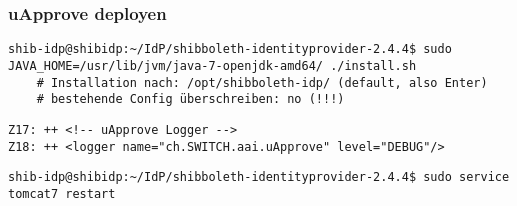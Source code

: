 \subsubsection*{uApprove deployen}
 \begin{lstlisting}
shib-idp@shibidp:~/IdP/shibboleth-identityprovider-2.4.4$ sudo JAVA_HOME=/usr/lib/jvm/java-7-openjdk-amd64/ ./install.sh
	# Installation nach: /opt/shibboleth-idp/ (default, also Enter)
	# bestehende Config überschreiben: no (!!!)
\end{lstlisting}
\begin{lstlisting}
Z17: ++ <!-- uApprove Logger -->
Z18: ++ <logger name="ch.SWITCH.aai.uApprove" level="DEBUG"/>
\end{lstlisting}
\begin{lstlisting}
shib-idp@shibidp:~/IdP/shibboleth-identityprovider-2.4.4$ sudo service tomcat7 restart
\end{lstlisting}

